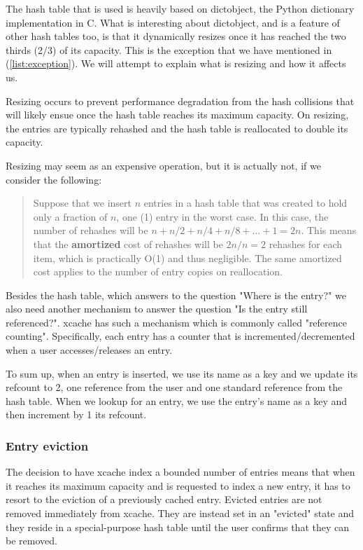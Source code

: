The hash table that is used is heavily based on dictobject\cite{dictobject},
the Python dictionary implementation in C. What is interesting about 
dictobject, and is a feature of other hash tables too, is that it dynamically
resizes once it has reached the two thirds (2/3) of its capacity. This is the 
exception that we have mentioned in (\ref{list:exception}). We will attempt to 
explain what is resizing and how it affects us.

Resizing occurs to prevent performance degradation from the hash collisions 
that will likely ensue once the hash table reaches its maximum capacity. On 
resizing, the entries are typically rehashed and the hash table is reallocated 
to double its capacity.

Resizing may seem as an expensive operation, but it is actually not, if we 
consider the following:
\begin{quotation}
\cite{hash-resize}Suppose that we insert \(n\) entries in a hash table that was 
created to hold only a fraction of \(n\), one (1) entry in the worst case. In 
this case, the number of rehashes will be \(n + n/2 + n/4 + n/8 + ... + 1 = 
	2n\).  This means that the \textbf{amortized} cost of rehashes will be 
\(2n/n = 2\) rehashes for each item, which is practically O(1) and thus 
negligible.  The same amortized cost applies to the number of entry copies on 
reallocation.
\end{quotation}

Besides the hash table, which answers to the question "Where is the entry?" we 
also need another mechanism to answer the question "Is the entry still 
referenced?". xcache has such a mechanism which is commonly called "reference 
counting". Specifically, each entry has a counter that is 
incremented/decremented when a user accesses/releases an entry.

To sum up, when an entry is inserted, we use its name as a key and we update 
its refcount to 2, one reference from the user and one standard reference from 
the hash table. When we lookup for an entry, we use the entry's name as a key 
and then increment by 1 its refcount. 

\subsubsection{Entry eviction}\label{sec:xcache-eviction-design}

The decision to have xcache index a bounded number of entries means that when 
it reaches its maximum capacity and is requested to index a new entry, it has 
to resort to the eviction of a previously cached entry. Evicted entries are not 
removed immediately from xcache. They are instead set in an "evicted" state and 
they reside in a special-purpose hash table until the user confirms that they 
can be removed. 

